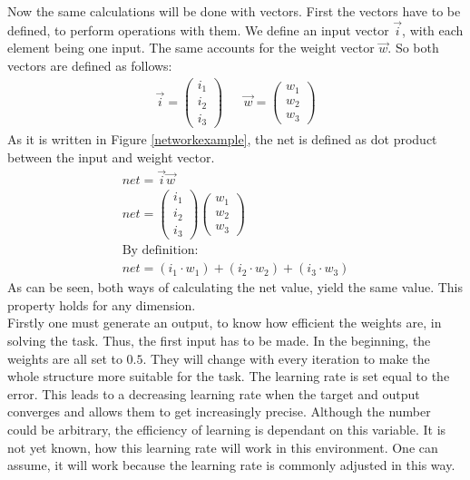 \documentclass[12pt]{article}
\begin{document}
Now the same calculations will be done with vectors. First the vectors have to be defined, to perform operations with them. We define an input vector $\vec{i}$, with each element being one input. The same accounts for the weight vector $\vec{w}$. So both vectors are defined as follows:
\begin{align}\nonumber
\vec{i} = \begin{pmatrix} 
i_{1}\\ 
i_{2}\\ 
i_{3}
\end{pmatrix}
&&
\vec{w} = \begin{pmatrix}
w_{1}\\ 
w_{2}\\ 
w_{3}
\end{pmatrix}
\end{align}
As it is written in Figure \ref{networkexample}, the net is defined as dot product between the input and weight vector.
\begin{equation}\nonumber
\begin{gathered}
net = \vec{i} \vec{w}\\
net = \begin{pmatrix} i_{1}\\ i_{2}\\ i_{3}\end{pmatrix}\begin{pmatrix}w_{1}\\ w_{2}\\ w_{3}\end{pmatrix}\\
\text{By definition:}\\
net = ( i_{1} \cdot w_{1} ) +( i_{2} \cdot w_{2}) + ( i_{3} \cdot w_{3})
\end{gathered}
\end{equation}
As can be seen, both ways of calculating the net value, yield the same value. This property holds for any dimension.\\
Firstly one must generate an output, to know how efficient the weights are, in solving the task. Thus, the first input has to be made. In the beginning, the weights are all set to $0.5$. They will change with every \gls{iteration} to make the whole structure more suitable for the task. 
The \gls{learning rate} is set equal to the error. This leads to a decreasing learning rate when the target and output converges and allows them to get increasingly precise. Although the number could be arbitrary, the efficiency of learning is dependant on this variable. It is not yet known, how this learning rate will work in this environment. One can assume, it will work because the learning rate is commonly adjusted in this way. 
\end{document}
